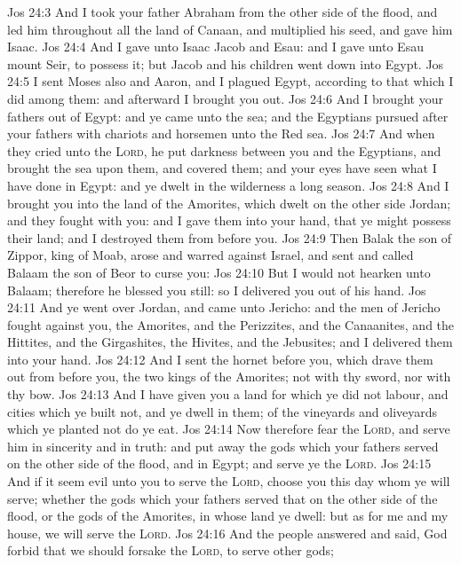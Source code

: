 \vs Jos 24:3 And I took your father Abraham from the other side of the flood, and led him throughout all the land of Canaan, and multiplied his seed, and gave him Isaac.
\vs Jos 24:4 And I gave unto Isaac Jacob and Esau: and I gave unto Esau mount Seir, to possess it; but Jacob and his children went down into Egypt.
\vs Jos 24:5 I sent Moses also and Aaron, and I plagued Egypt, according to that which I did among them: and afterward I brought you out.
\vs Jos 24:6 And I brought your fathers out of Egypt: and ye came unto the sea; and the Egyptians pursued after your fathers with chariots and horsemen unto the Red sea.
\vs Jos 24:7 And when they cried unto the \textsc{Lord}, he put darkness between you and the Egyptians, and brought the sea upon them, and covered them; and your eyes have seen what I have done in Egypt: and ye dwelt in the wilderness a long season.
\vs Jos 24:8 And I brought you into the land of the Amorites, which dwelt on the other side Jordan; and they fought with you: and I gave them into your hand, that ye might possess their land; and I destroyed them from before you.
\vs Jos 24:9 Then Balak the son of Zippor, king of Moab, arose and warred against Israel, and sent and called Balaam the son of Beor to curse you:
\vs Jos 24:10 But I would not hearken unto Balaam; therefore he blessed you still: so I delivered you out of his hand.
\vs Jos 24:11 And ye went over Jordan, and came unto Jericho: and the men of Jericho fought against you, the Amorites, and the Perizzites, and the Canaanites, and the Hittites, and the Girgashites, the Hivites, and the Jebusites; and I delivered them into your hand.
\vs Jos 24:12 And I sent the hornet before you, which drave them out from before you,  the two kings of the Amorites;  not with thy sword, nor with thy bow.
\vs Jos 24:13 And I have given you a land for which ye did not labour, and cities which ye built not, and ye dwell in them; of the vineyards and oliveyards which ye planted not do ye eat.
\vs Jos 24:14 Now therefore fear the \textsc{Lord}, and serve him in sincerity and in truth: and put away the gods which your fathers served on the other side of the flood, and in Egypt; and serve ye the \textsc{Lord}.
\vs Jos 24:15 And if it seem evil unto you to serve the \textsc{Lord}, choose you this day whom ye will serve; whether the gods which your fathers served that  on the other side of the flood, or the gods of the Amorites, in whose land ye dwell: but as for me and my house, we will serve the \textsc{Lord}.
\vs Jos 24:16 And the people answered and said, God forbid that we should forsake the \textsc{Lord}, to serve other gods;
